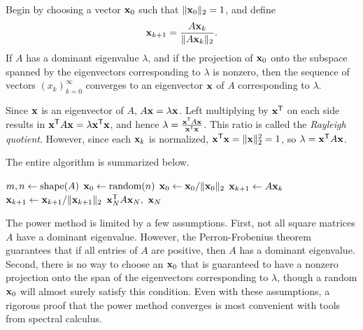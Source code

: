 Begin by choosing a vector $\mathbf{x}_0$ such that $\|\mathbf{x}_0\|_2=1$, and define
\[
\mathbf{x}_{k+1} = \frac{A\mathbf{x}_k}{\|A\mathbf{x}_k\|_2}.
\]
If $A$ has a dominant eigenvalue $\lambda$, and if the projection of $\mathbf{x}_0$ onto the subspace spanned by the eigenvectors corresponding to $\lambda$ is nonzero, then the sequence of vectors $(x_k)_{k=0}^\infty$ converges to an eigenvector $\mathbf{x}$ of $A$ corresponding to $\lambda$.

Since $\mathbf{x}$ is an eigenvector of $A$, $A\mathbf{x} = \lambda \mathbf{x}$.
Left multiplying by $\mathbf{x}^{\mathsf T}$ on each side results in $\mathbf{x}^{\mathsf T} A\mathbf{x} = \lambda \mathbf{x}^{\mathsf T}\mathbf{x}$, and hence $\lambda = \frac{\mathbf{x}^{\mathsf T} A\mathbf{x}}{\mathbf{x}^{\mathsf T}\mathbf{x}}$.
This ratio is called the \emph{Rayleigh quotient}.
However, since each $\mathbf{x}_k$ is normalized, $\mathbf{x}^{\mathsf T}\mathbf{x} = \|\mathbf{x}\|_2^2 = 1$, so $\lambda = \mathbf{x}^{\mathsf T} A\mathbf{x}$.

The entire algorithm is summarized below.

\begin{algorithm}[H] %
\begin{algorithmic}[1]
    \State $m, n \gets \mathrm{shape}(A)$
    \State $\mathbf{x}_0 \gets \mbox{random}(n)$
    \State $\mathbf{x}_0 \gets \mathbf{x}_0/\|\mathbf{x}_0\|_2$
        \label{step:power-method-stopping-criterion}
        \State $\mathbf{x}_{k+1} \gets A\mathbf{x}_k$
        \label{step:power-method-main-step}
        \State $\mathbf{x}_{k+1} \gets \mathbf{x}_{k+1}/\|\mathbf{x}_{k+1}\|_2$
    \EndFor
    \State {} $\mathbf{x}_N^{\mathsf T} A \mathbf{x}_N,\ \mathbf{x}_N$
\EndProcedure
\end{algorithmic}
\caption{}
\label{Alg:power-method}
\end{algorithm}

The power method is limited by a few assumptions.
First, not all square matrices $A$ have a dominant eigenvalue.
However, the Perron-Frobenius theorem guarantees that if all entries of $A$ are positive, then $A$ has a dominant eigenvalue.
Second, there is no way to choose an $\mathbf{x}_0$ that is guaranteed to have a nonzero projection onto the span of the eigenvectors corresponding to $\lambda$, though a random $\mathbf{x}_0$ will almost surely satisfy this condition.
Even with these assumptions, a rigorous proof that the power method converges is most convenient with tools from spectral calculus.

